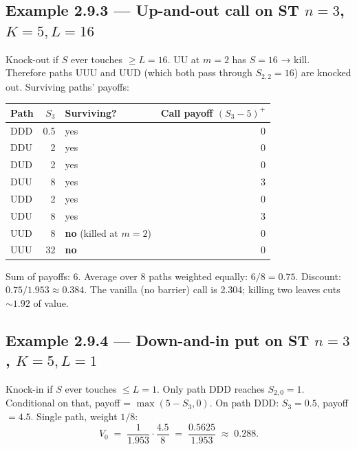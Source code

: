 \documentclass[
  10pt,
  twoside]{book}
\newcounter{none} %
\begin{document}
\subsection{\texorpdfstring{Example 2.9.3 --- Up-and-out call on ST
\(n=3\),
\(K=5, L=16\)}{Example 2.9.3 --- Up-and-out call on ST n=3, K=5, L=16}}\label{example-2.9.3-up-and-out-call-on-st-n3-k5-l16}

Knock-out if \(S\) ever touches \(\ge L=16\). UU at \(m=2\) has \(S=16\)
→ kill. Therefore paths UUU and UUD (which both pass through
\(S_{2,2}=16\)) are knocked out. Surviving paths' payoffs:

{\def\LTcaptype{none} %
\begin{table}[H]
\centering
\begin{tabular}{|l|r|l|r|}
\toprule
Path & \(S_3\) & Surviving? & Call payoff \((S_3-5)^+\) \\
\midrule



DDD & 0.5 & yes & 0 \\
DDU & 2 & yes & 0 \\
DUD & 2 & yes & 0 \\
DUU & 8 & yes & 3 \\
UDD & 2 & yes & 0 \\
UDU & 8 & yes & 3 \\
UUD & 8 & \textbf{no} (killed at \(m=2\)) & 0 \\
UUU & 32 & \textbf{no} & 0 \\
\bottomrule
\end{tabular}
\end{table}
}

Sum of payoffs: 6. Average over 8 paths weighted equally: \(6/8=0.75\).
Discount: \(0.75/1.953\approx 0.384\). The vanilla (no barrier) call is
2.304; killing two leaves cuts \(\sim 1.92\) of value.

\subsection{\texorpdfstring{Example 2.9.4 --- Down-and-in put on ST
\(n=3\),
\(K=5, L=1\)}{Example 2.9.4 --- Down-and-in put on ST n=3, K=5, L=1}}\label{example-2.9.4-down-and-in-put-on-st-n3-k5-l1}

Knock-in if \(S\) ever touches \(\le L=1\). Only path DDD reaches
\(S_{2,0}=1\). Conditional on that, payoff = \(\max(5-S_3,0)\). On path
DDD: \(S_3=0.5\), payoff \(=4.5\). Single path, weight \(1/8\): \[
V_0 \;=\; \frac{1}{1.953}\cdot \frac{4.5}{8} \;=\; \frac{0.5625}{1.953} \;\approx\; 0.288.
\]
\end{document}
